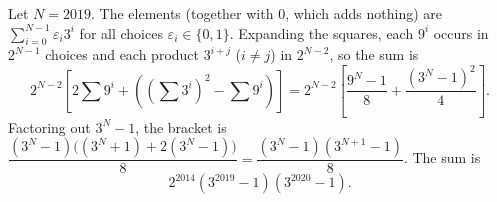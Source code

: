 Let $N=2019$. The elements (together with $0$, which adds nothing) are $\sum_{i=0}^{N-1}\varepsilon_i3^i$ for all choices $\varepsilon_i\in\{0,1\}$. Expanding the squares, each $9^i$ occurs in $2^{N-1}$ choices and each product $3^{i+j}$ ($i\ne j$) in $2^{N-2}$, so the sum is
\[2^{N-2}\left[2\sum9^i+\left(\left(\sum3^i\right)^2-\sum9^i\right)\right]=2^{N-2}\left[\dfrac{9^N-1}8+\dfrac{(3^N-1)^2}4\right].\]
Factoring out $3^N-1$, the bracket is $\dfrac{(3^N-1)\big((3^N+1)+2(3^N-1)\big)}8=\dfrac{(3^N-1)(3^{N+1}-1)}8$. The sum is
\[\boxed{2^{2014}\left(3^{2019}-1\right)\left(3^{2020}-1\right)}.\]
